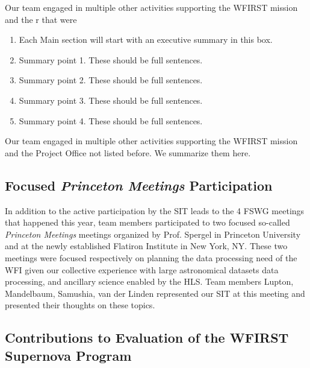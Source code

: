 

\begin{summary}
Our team engaged in multiple other activities supporting the WFIRST mission and the r that were
\begin{enumerate}
\item Each Main section will start with an executive summary in this box.
\item Summary point 1. These should be full sentences.
\item Summary point 2. These should be full sentences.
\item Summary point 3. These should be full sentences.
\item Summary point 4. These should be full sentences.
\end{enumerate}
\end{summary}

Our team engaged in multiple other activities supporting the WFIRST mission and the Project Office not listed before. We summarize them here.

\subsection{Focused \emph{Princeton Meetings} Participation}

In addition to the active participation by the SIT leads to the 4 FSWG meetings that happened this year, team members participated to two focused so-called \emph{Princeton Meetings} meetings organized by Prof. Spergel in Princeton University and at the newly established Flatiron Institute in  New York, NY. These two meetings were focused respectively on planning the data processing need of the WFI given our collective experience with large astronomical datasets data processing, and ancillary science enabled by the HLS. Team members Lupton, Mandelbaum, Samushia, van der Linden represented our SIT at this meeting and presented their thoughts on these topics.

\subsection{Contributions to Evaluation of the WFIRST Supernova Program}

